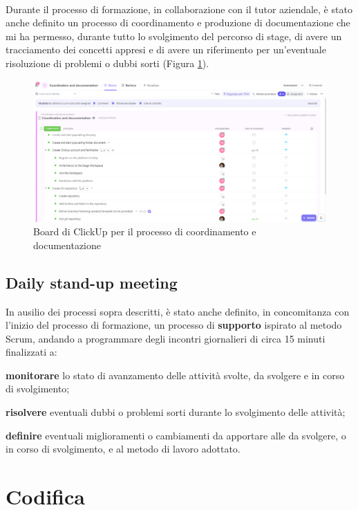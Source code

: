 \\
Durante il processo di formazione, in collaborazione con il tutor aziendale, è stato anche definito un processo di coordinamento e produzione di 
documentazione che mi ha permesso, durante tutto lo svolgimento del percorso di stage, di avere un tracciamento dei concetti appresi e 
 di avere un riferimento per un'eventuale risoluzione di problemi o dubbi sorti (Figura \ref{cap:Documentazione}).
\begin{figure}[h]
    \centering
    \includegraphics[width=1\textwidth]{images/percorso/coordinamento.png}
    \caption{Board di ClickUp per il processo di coordinamento e documentazione}
    \label{cap:Documentazione}
\end{figure}
\subsection{Daily stand-up meeting}
In ausilio dei processi sopra descritti, 
è stato anche definito, in concomitanza con l'inizio del processo di formazione, un processo di \textbf{supporto} ispirato al metodo \gls{Scrum}{}, 
andando a programmare degli incontri giornalieri di circa 15 minuti finalizzati a:
\begin{list}{*}
    \item \textbf{monitorare} lo stato di avanzamento delle attività svolte, da svolgere e in corso di svolgimento;
    \item \item \textbf{risolvere} eventuali dubbi o problemi sorti durante lo svolgimento delle attività;
    \item \textbf{definire} eventuali miglioramenti o cambiamenti da apportare alle da svolgere, o in corso di svolgimento, e al metodo 
    di lavoro adottato.
\end{list}
\section{Codifica}
